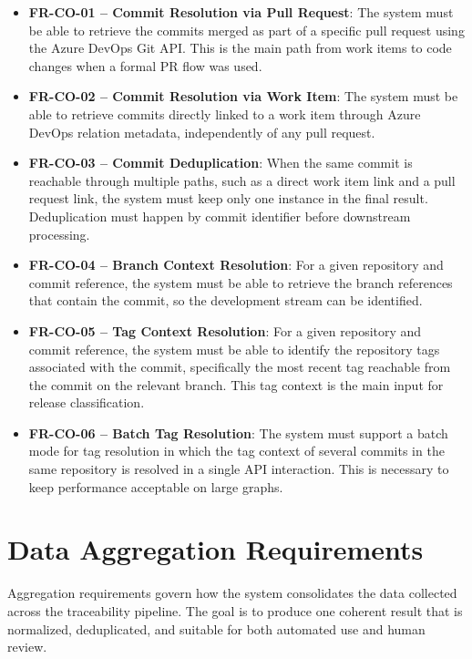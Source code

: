 \begin{itemize}
  \item \textbf{FR-CO-01 -- Commit Resolution via Pull Request}: The system must be able to retrieve the commits merged as part of a specific pull request using the Azure DevOps Git API. This is the main path from work items to code changes when a formal PR flow was used.

  \item \textbf{FR-CO-02 -- Commit Resolution via Work Item}: The system must be able to retrieve commits directly linked to a work item through Azure DevOps relation metadata, independently of any pull request.

  \item \textbf{FR-CO-03 -- Commit Deduplication}: When the same commit is reachable through multiple paths, such as a direct work item link and a pull request link, the system must keep only one instance in the final result. Deduplication must happen by commit identifier before downstream processing.

  \item \textbf{FR-CO-04 -- Branch Context Resolution}: For a given repository and commit reference, the system must be able to retrieve the branch references that contain the commit, so the development stream can be identified.

  \item \textbf{FR-CO-05 -- Tag Context Resolution}: For a given repository and commit reference, the system must be able to identify the repository tags associated with the commit, specifically the most recent tag reachable from the commit on the relevant branch. This tag context is the main input for release classification.

  \item \textbf{FR-CO-06 -- Batch Tag Resolution}: The system must support a batch mode for tag resolution in which the tag context of several commits in the same repository is resolved in a single API interaction. This is necessary to keep performance acceptable on large graphs.
\end{itemize}

\section{Data Aggregation Requirements}
\label{sec:req-aggregation}

Aggregation requirements govern how the system consolidates the data collected
across the traceability pipeline. The goal is to produce one coherent result
that is normalized, deduplicated, and suitable for both automated use and human
review.

